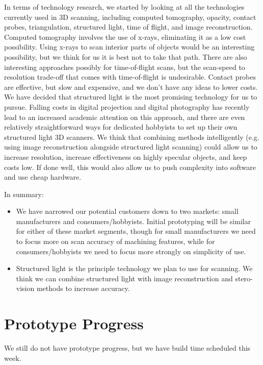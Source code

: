 \documentclass[10pt]{article}
\begin{document}
In terms of technology research, we started by looking at all the technologies
currently used in 3D scanning, including computed tomography, opacity, contact
probes, triangulation, structured light, time of flight, and image
reconstruction. Computed tomography involves the use of x-rays, eliminating it
as a low cost possibility. Using x-rays to scan interior parts of objects would
be an interesting possibility, but we think for us it is best not to take that
path. There are also interesting approaches possibly for time-of-flight scans,
but the scan-speed to resolution trade-off that comes with time-of-flight is
undesirable. Contact probes are effective, but slow and expensive, and we don't
have any ideas to lower costs. We have decided that structured light is the most
promising technology for us to pursue. Falling costs in digital projection and
digital photography has recently lead to an increased academic attention on this
approach, and there are even relatively straightforward ways for dedicated
hobbyists to set up their own structured light 3D scanners. We think that
combining methods intelligently (e.g. using image reconstruction alongside
structured light scanning) could allow us to increase resolution, increase
effectiveness on highly specular objects, and keep costs low. If done well, this
would also allow us to push complexity into software and use cheap hardware.

In summary:
\begin{itemize}
\item We have narrowed our potential customers down to two markets: small
  manufacturers and consumers/hobbyists. Initial prototyping will be
  similar for either of these market segments, though for small manufacturers we
  need to focus more on scan accuracy of machining features, while for
  consumers/hobbyists we need to focus more strongly on simplicity of use.

\item Structured light is the principle technology we plan to use for scanning.
  We think we can combine structured light with image reconstruction and stero-vision
  methods to increase accuracy.
\end{itemize}

\section{Prototype Progress}
We still do not have prototype progress, but we have build time scheduled this
week.
\end{document}
